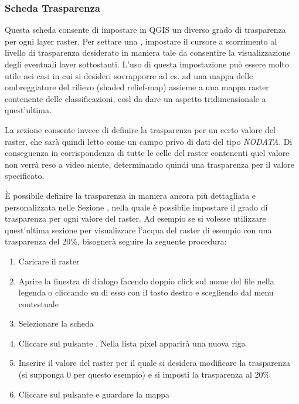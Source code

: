 \subsubsection{Scheda Trasparenza} \label{rastertab:transparency}

Questa scheda consente di impostare in QGIS un diverso grado di trasparenza per ogni layer raster.
Per settare una , impostare il cursore a scorrimento al livello di trasparenza desiderato
in maniera tale da consentire la visualizzazione degli eventuali layer sottostanti. 
L'uso di questa impostazione può essere molto utile nei casi in cui si
desideri sovrapporre ad es. ad una mappa delle ombreggiature del rilievo (shaded
relief-map) assieme a una mappa raster contenente delle classificazioni, così da dare un
aspetto tridimensionale a quest'ultima.

La sezione  consente invece di definire la trasparenza per un certo valore del raster, che sarà quindi letto come un campo privo di dati del tipo {\em NODATA}. Di
conseguenza in corrispondenza di tutte le celle del raster contenenti quel
valore non verrà reso a video niente, determinando quindi una trasparenza per
il valore specificato.

È possibile definire la trasparenza in maniera ancora più dettagliata e
personalizzata nelle Sezione , nella quale è possibile impostare il grado di trasparenza per
ogni valore del raster.
Ad esempio se si volesse utilizzare quest'ultima sezione per visualizzare l'acqua del raster di esempio 
con una trasparenza del 20\%, bisognerà seguire la seguente procedura:

\begin{enumerate}
 \item Caricare il raster 
 \item Aprire la finestra di dialogo  facendo doppio click
 sul nome del file nella legenda o cliccando su di esso con il tasto destro e
 scegliendo  dal menu contestuale
 \item Selezionare la scheda 
 \item \label{enum:add} Cliccare sul pulsante
 . Nella lista
 pixel apparirà una nuova riga
 \item \label{enum:transp} Inserire il valore del raster per il quale si
 desidera modificare la trasparenza (si supponga 0 per questo esempio) e si
 imposti la trasparenza al 20\%
 \item Cliccare sul pulsante  e guardare la mappa
\end{enumerate}

